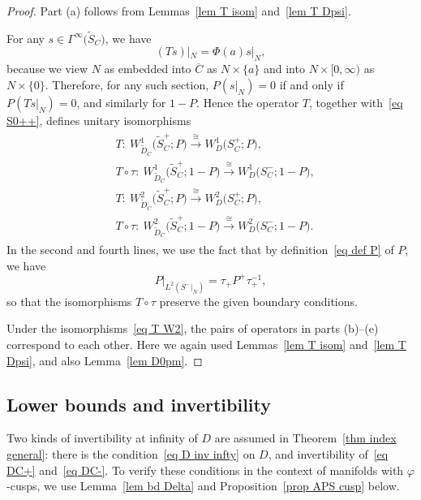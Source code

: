 \documentclass[pdftex]{sigma}%
\numberwithin{equation}{section}
\begin{document}
\begin{proof}
Part (a) follows from Lemmas~\ref{lem T isom} and~\ref{lem T Dpsi}.

For any $s \in \Gamma^{\infty}\big(\widetilde{S}_C\big)$, we have
\[
(Ts)|_N = \Phi(a) s|_N,
\]
because we view $N$ as embedded into $\overline{C}$ as $N\times \{a\}$ and into $N \times [0,\infty)$ as $N \times \{0\}$. Therefore, for any such section, $P(s|_N) = 0$ if and only if $P (Ts|_N) = 0$, and similarly for $1-P$. Hence the operator $T$, together with~\eqref{eq S0++}, defines unitary isomorphisms
\begin{align}\label{eq T W2}
\begin{split}
&T\colon\ W^1_{\widetilde{D}_C}\big(\widetilde{S}_C^+; P\big) \xrightarrow{\cong} W^1_{D}\big(S_C^+; P\big), \\
&T \circ \tau \colon\ W^1_{\widetilde{D}_C}\big(\widetilde{S}_C^+;1- P\big) \xrightarrow{\cong}W^1_{D}\big(S_C^-;1- P\big), \\
&T\colon\ W^2_{\widetilde{D}_C}\big(\widetilde{S}_C^+; P\big) \xrightarrow{\cong}W^2_{D}\big(S_C^+; P\big),\\
&T\circ \tau \colon\ W^2_{\widetilde{D}_C}\big(\widetilde{S}_C^+; 1-P\big) \xrightarrow{\cong}W^2_{D}\big(S_C^-; 1-P\big).
\end{split}
\end{align}
In the second and fourth lines, we use the fact that by definition~\eqref{eq def P} of $P$, we have
\[
P|_{L^2(S^-|_N)} = \tau_+ P^+ \tau_+^{-1},
\]
so that the isomorphisms $T \circ \tau$ preserve the given boundary conditions.

Under the isomorphisms~\eqref{eq T W2}, the pairs of operators in parts (b)--(e) correspond to each other. Here we again used Lemmas~\ref{lem T isom} and~\ref{lem T Dpsi}, and also Lemma~\ref{lem D0pm}.
\end{proof}

\subsection{Lower bounds and invertibility}%

Two kinds of invertibility at infinity of $D$ are assumed in Theorem~\ref{thm index general}: there is the condition~\eqref{eq D inv infty} on $D$, and invertibility of~\eqref{eq DC+} and~\eqref{eq DC-}. To verify these conditions in the context of manifolds with $\varphi$-cusps, we use Lemma~\ref{lem bd Delta} and Proposition~\ref{prop APS cusp} below.
\end{document}

